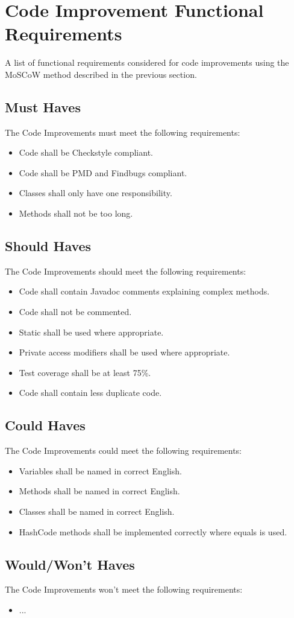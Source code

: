 \section{Code Improvement Functional Requirements}

A list of functional requirements considered for code improvements using the MoSCoW method described in the previous section.

\subsection{Must Haves}
The Code Improvements must meet the following requirements:
\begin{itemize}
	\item Code shall be Checkstyle compliant.
	\item Code shall be PMD and Findbugs compliant.
	\item Classes shall only have one responsibility.
	\item Methods shall not be too long.
\end{itemize}

\subsection{Should Haves}
The Code Improvements should meet the following requirements:
\begin{itemize}
	\item Code shall contain Javadoc comments explaining complex methods.
	\item Code shall not be commented.
	\item Static shall be used where appropriate.
	\item Private access modifiers shall be used where appropriate.
	\item Test coverage shall be at least 75\%.
	\item Code shall contain less duplicate code.
\end{itemize}

\subsection{Could Haves}
The Code Improvements could meet the following requirements:
\begin{itemize}
	\item Variables shall be named in correct English.
	\item Methods shall be named in correct English.
	\item Classes shall be named in correct English.
	\item HashCode methods shall be implemented correctly where equals is used.
\end{itemize}

\subsection{Would/Won't Haves}
The Code Improvements won't meet the following requirements:
\begin{itemize}
	\item ...
\end{itemize}